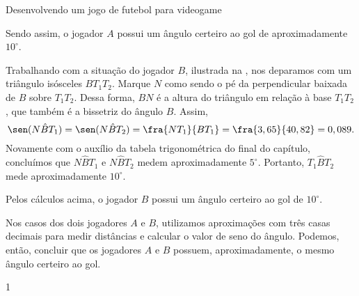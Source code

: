 \begin{answer}{Desenvolvendo um jogo de futebol para videogame}
{\begin{enumerate}
    Sendo assim, o jogador $A$ possui um ângulo certeiro ao gol de aproximadamente $10^\circ$.
    
    
    Trabalhando com a situação do jogador $B$, ilustrada na , nos deparamos com um triângulo isósceles $BT_1T_2$. Marque $N$ como sendo o pé da perpendicular baixada de $B$ sobre $T_1T_2$. Dessa forma, $BN$ é a altura do triângulo em relação à base $T_1T_2$, que também é a bissetriz do ângulo $B$. Assim,
    $$\sen(N\hat{B}T_1)=\sen(N\hat{B}T_2)=\fra{NT_1}{BT_1}=\fra{3,65}{40,82}=0,089.$$
    Novamente com o auxílio da tabela trigonométrica do final do capítulo, concluímos que $N\hat{B}T_1$ e $N\hat{B}T_2$ medem aproximadamente $5^\circ$. Portanto, $T_1\hat{B}T_2$ mede aproximadamente $10^\circ$.
    
    Pelos cálculos acima, o jogador $B$ possui um ângulo certeiro ao gol de $10^\circ$.
    
    Nos casos dos dois jogadores $A$ e $B$, utilizamos aproximações com três casas decimais para medir distâncias e calcular o valor de seno do ângulo. Podemos, então, concluir que os jogadores $A$ e $B$ possuem, aproximadamente, o mesmo ângulo certeiro ao gol. 
\end{enumerate}
}{1}
\end{answer}

